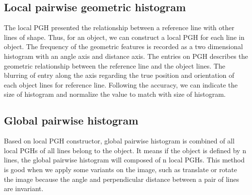 \subsection{Local pairwise geometric histogram}
The local PGH presented the relationship between a reference line with other lines of shape. Thus, for an object, we can construct a local PGH for each line in object. The frequency of the geometric features is recorded as a two dimensional histogram with an angle axis and distance axis. The entries on PGH describes the geometric relationship between the reference line and the object lines. The blurring of entry along the axis regarding the true position and orientation of each object lines for reference line. Following the accuracy, we can indicate the size of histogram and normalize the value to match with size of histogram.
\subsection{Global pairwise histogram}
Based on local PGH constructor, global pairwise histogram is combined of all local PGHs of all lines belong to the object. It means if the object is defined by n lines, the global pairwise histogram will composed of n local PGHs. This method is good when we apply some variants on the image, such as translate or rotate the image because the angle and perpendicular distance between a pair of lines are invariant.
